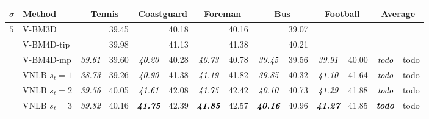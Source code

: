 \documentclass[10pt, journal, twocolumn, final, a4paper]{IEEEtran}
\newcommand{\best}[1]{#1}
\newcommand{\bsic}[1]{\textcolor{black}{\textit{#1}}}
\newcommand{\Bsic}[1]{\textcolor{black}{\textbf{\textit{#1}}}}
\begin{document}
%

\begin{table}[htp!]
	\begin{center}
		{%
		\renewcommand{\tabcolsep}{1.6mm}
		\renewcommand{\arraystretch}{1.3}
		\begin{tabular}{ c | l |c c | c c | c c | c c | c c | c c}
			\hline
			\rule{0pt}{10pt}$\sigma$ & Method            & \multicolumn{2}{c}{Tennis}  & \multicolumn{2}{c}{Coastguard}&\multicolumn{2}{c}{Foreman}& \multicolumn{2}{c}{Bus}     &\multicolumn{2}{c|}{Football}& \multicolumn{2}{c}{Average}\\\hline
			\multirow{1}{*}{$ 5$}
			                      & V-BM3D               & \bsic{     } &       39.45  & \bsic{     } &       40.18  & \bsic{     } &       40.16  & \bsic{     } &       39.07  & \bsic{     } &              & \bsic{     } &              \\
			                      & V-BM4D-tip           & \bsic{     } & \best{39.98} & \bsic{     } & \best{41.13} & \bsic{     } & \best{41.38} & \bsic{     } & \best{40.21} & \bsic{     } & \best{     } & \bsic{     } & \best{     } \\
			                      & V-BM4D-mp            & \bsic{39.61} &       39.60  & \bsic{40.20} &       40.28  & \bsic{40.73} &       40.78  & \bsic{39.45} &       39.56  & \bsic{39.91} &       40.00  & \bsic{todo } &       todo   \\
			                      & VNLB   $s_t = 1$     & \bsic{38.73} &       39.26  & \bsic{40.90} &       41.38  & \bsic{41.19} &       41.82  & \bsic{39.85} &       40.32  & \bsic{41.10} &       41.64  & \bsic{todo } &       todo   \\
			                      & VNLB   $s_t = 2$     & \bsic{39.56} &       40.05  & \bsic{41.61} &       42.08  & \bsic{41.75} &       42.42  & \bsic{40.10} &       40.73  & \bsic{41.29} &       41.88  & \bsic{todo } &       todo   \\
			                      & VNLB   $s_t = 3$     & \bsic{39.82} &       40.16  & \Bsic{41.75} &       42.39  & \Bsic{41.85} &       42.57  & \Bsic{40.16} &       40.96  & \Bsic{41.27} &       41.85  & \Bsic{todo } &       todo   \\

\end{tabular}}
\end{center}
\end{table}
\end{document}
